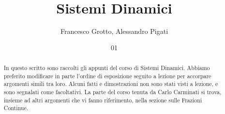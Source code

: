 \documentclass[italian,course]{Notes}
\title{Sistemi Dinamici}
\author{Francesco Grotto, Alessandro Pigati}
\date{01}{10}{2014}
\begin{document}
\newtheorem{teo}{Teorema}
\newtheorem{defi}[teo]{Definizione}
\newtheorem{cor}[teo]{Corollario}
\newtheorem{lem}[teo]{Lemma}
\newtheorem{prop}[teo]{Proposizione}
\newtheorem{oss}[teo]{Osservazione}
\newtheorem{esempio}[teo]{Esempio}
\newtheorem{esercizio}[teo]{Esercizio}





\begin{abstract}
 In questo scritto sono raccolti gli appunti del corso di Sistemi Dinamici. Abbiamo preferito modificare in parte l'ordine di esposizione seguito a lezione per accorpare argomenti simili tra loro. Alcuni fatti e dimostrazioni non sono stati visti a lezione, e sono segnalati come facoltativi. La parte del corso tenuta da Carlo Carminati si trova, insieme ad altri argomenti che vi fanno riferimento, nella sezione sulle Frazioni Continue.
\end{abstract}














\end{document}
